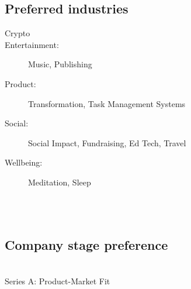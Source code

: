 {{\subsection*{Preferred industries
}
\begin{description}
 \item[Crypto]
\item[Entertainment:] Music, Publishing %
\item[Product:]
Transformation,
Task Management Systems
\item[Social:] Social Impact, Fundraising, Ed Tech, Travel %
\item[Wellbeing:] Meditation, Sleep %
\end{description}
\\ \\
\subsection*{Company stage preference}     \\
Series A:
Product-Market Fit \\




    }%
}
